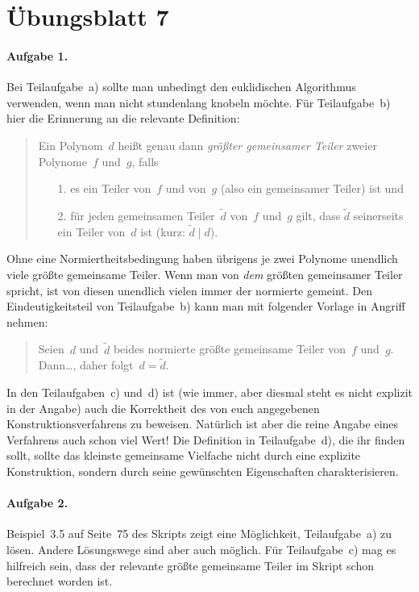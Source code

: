 \documentclass{../algblatt}
\begin{document}
\section*{Übungsblatt 7}

\paragraph{Aufgabe 1.} Bei Teilaufgabe~a) sollte man unbedingt den euklidischen
Algorithmus verwenden, wenn man nicht stundenlang knobeln möchte. Für
Teilaufgabe~b) hier die Erinnerung an die relevante Definition:
\begin{quote}Ein Polynom~$d$ heißt genau dann \emph{größter gemeinsamer Teiler}
zweier Polynome~$f$ und~$g$, falls
\begin{enumerate}
\item[1.] es ein Teiler von~$f$ und von~$g$ (also ein gemeinsamer Teiler) ist und
\item[2.] für jeden gemeinsamen Teiler~$\widetilde d$ von~$f$ und~$g$ gilt,
dass $\widetilde d$ seinerseits ein Teiler
von~$d$ ist (kurz: $\widetilde d \mid d$).
\end{enumerate}
\end{quote}
Ohne eine Normiertheitsbedingung haben übrigens je zwei Polynome unendlich
viele größte gemeinsame Teiler. Wenn man von \emph{dem} größten gemeinsamer
Teiler spricht, ist von diesen unendlich vielen immer der normierte gemeint.
Den Eindeutigkeitsteil von Teilaufgabe~b) kann man mit folgender Vorlage in
Angriff nehmen:
\begin{quote}Seien~$d$ und~$\widetilde d$ beides normierte größte gemeinsame
Teiler von~$f$ und~$g$. Dann\ldots, daher folgt~$d = \widetilde d$.\end{quote}
In den Teilaufgaben~c) und~d) ist (wie immer, aber diesmal steht es nicht
explizit in der Angabe) auch die Korrektheit des von euch angegebenen
Konstruktionsverfahrens zu beweisen. Natürlich ist aber die reine Angabe eines
Verfahrens auch schon viel Wert! Die Definition in Teilaufgabe~d), die ihr
finden sollt, sollte das kleinste gemeinsame Vielfache nicht durch eine
explizite Konstruktion, sondern durch seine gewünschten Eigenschaften
charakterisieren.

\paragraph{Aufgabe 2.} Beispiel~3.5 auf Seite~75 des Skripts zeigt eine
Möglichkeit, Teilaufgabe~a) zu lösen. Andere Lösungswege sind aber auch
möglich. Für Teilaufgabe~c) mag es hilfreich sein, dass der relevante größte
gemeinsame Teiler im Skript schon berechnet worden ist.
\end{document}
